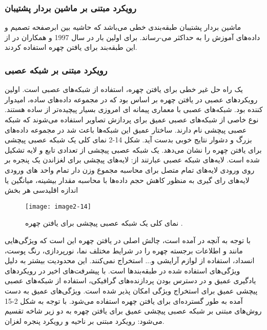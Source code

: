  \subsubsection{رویکرد مبتنی بر ماشین بردار پشتیبان}
ماشین‌ بردار پشتیبان  طبقه‌بندی خطی می‌باشد که حاشیه بین ابرصفحه تصمیم و داده‌های آموزش را به حداکثر می-رساند. برای اولین بار در سال 1997  و همکاران در \cite{609310} از این طبقه‌بند برای یافتن چهره استفاده کردند.

 \subsubsection{رویکرد مبتنی بر شبکه‌ عصبی}
یک راه حل غیر خطی برای یافتن چهره، استفاده از شبکه‌های عصبی  است. اولین رویکردهای عصبی در یافتن چهره بر اساس  بود که در مجموعه داده‌های ساده، امیدوار کننده بود. شبکه‌های عصبی با معماری پیمانه ای  امروزی بسیار پیچیده‌تر از   ساده هستند. نوع خاصی از شبکه‌های عصبی عمیق برای پردازش تصاویر استفاده می‌شوند که شبکه عصبی پیچشی   نام دارند. ساختار عمیق این شبکه‌ها باعث شد در مجموعه داده‌های بزرگ و دشوار نتایج خوبی بدست آید. شکل ‏2-14 نمای کلی یک شبکه عصبی پیچشی برای یافتن چهره را نشان می‌دهد. یک شبکه عصبی پیچشی از تعدادی تابع و لایه تشکیل شده است. لایه‌های شبکه عصبی عبارتند از:
\noindent
لایه‌های پیچشی  برای لغزاندن یک پنجره بر روی ورودی
\noindent
لایه‌های تمام متصل   برای محاسبه مجموع وزن دار تمام واحد های ورودی
\noindent
لایه‌های رای گیری  به منظور کاهش حجم داده‌ها با محاسبه مقدار بیشینه، میانگین یا اندازه اقلیدسی هر بخش

\begin{figure}[h]
\centering
  \texttt{[image: image2-14]}
  \caption{نمای کلی یک شبکه عصبی پیچشی برای یافتن چهره \cite{ref1}.}
  \label{image2-14}
\end{figure}

\noindent
با توجه به آنچه در \cite{8253595} آمده است، چالش اصلی در یافتن چهره این است که ویژگی‌هایی مانند  و  اطلاعات برجسته چهره را در شرایط مختلف نما، نورپردازی، رنگ پوست، انسداد، استفاده از لوازم آرایشی و... استخراج نمی‌کنند. این محدودیت بیشتر به دلیل ویژگی‌های استفاده شده در طبقه‌بندها است. با پیشرفت‌های اخیر در رویکردهای یادگیری عمیق و در دسترس بودن پردازنده‌های گرافیکی، استفاده از شبکه‌های عصبی پیچشی عمیق برای استخراج ویژگی امکان پذیر شده است. ویژگی‌های عمیق به دست آمده به طور گسترده‌ای برای یافتن چهره استفاده می‌شود. با توجه به شکل 2-15 روش‌های مبتنی بر شبکه عصبی پیچشی عمیق برای یافتن چهره به دو زیر شاخه تقسیم می‌شود: رویکرد مبتنی بر ناحیه و رویکرد پنجره لغزان.

